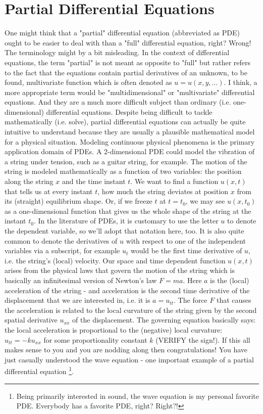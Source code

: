 \section{Partial Differential Equations}
One might think that a "partial" differential equation (abbreviated as PDE) ought to be easier to deal with than a "full" differential equation, right? Wrong! The terminology might by a bit misleading. In the context of differential equations, the term "partial" is not meant as opposite to "full" but rather refers to the fact that the equations contain partial derivatives of an unknown, to be found, multivariate function which is often denoted as $u = u(x,y,\ldots)$. I think, a more appropriate term would be "multidimensional" or "multivariate" differential equations. And they are a much more difficult subject than ordinary (i.e. one-dimensional) differential equations. Despite being difficult to tackle mathematically (i.e. solve), partial differential equations can actually be quite intuitive to understand because they are usually a plausible mathematical model for a physical situation. Modeling continuous physical phenomena is the primary application domain of PDEs. A 2-dimensional PDE could model the vibration of a string under tension, such as a guitar string, for example. The motion of the string is modeled mathematically as a function of two variables: the position along the string $x$ and the time instant $t$. We want to find a function $u(x,t)$ that tells us at every instant $t$, how much the string deviates at position $x$ from its (straight) equilibrium shape. Or, if we freeze $t$ at $t = t_0$, we may see $u(x, t_0)$ as a one-dimensional function that gives us the whole shape of the string at the instant $t_0$. In the literature of PDEs, it is customary to use the letter $u$ to denote the dependent variable, so we'll adopt that notation here, too. It is also quite common to denote the derivatives of $u$ with respect to one of the independent variables via a subscript, for example $u_t$ would be the first time derivative of $u$, i.e. the string's (local) velocity. Our space and time dependent function $u(x,t)$ arises from the physical laws that govern the motion of the string which is basically an infinitesimal version of Newton's law $F = m a$. Here $a$ is the (local) acceleration of the string - and acceleration is the second time derivative of the displacement that we are interested in, i.e. it is $a = u_{tt}$. The force $F$ that causes the acceleration is related to the local curvature of the string given by the second spatial derivative $u_{xx}$ of the displacement. The governing equation basically says: the local acceleration is proportional to the (negative) local curvature: $u_{tt} = -k u_{xx}$ for some proportionality constant $k$ (VERIFY the sign!). If this all makes sense to you and you are nodding along then congratulations! You have just casually understood the wave equation - one important example of a partial differential equation \footnote{Being primarily interested in sound, the wave equation is my personal favorite PDE. Everybody has a favorite PDE, right? Right?!}.




